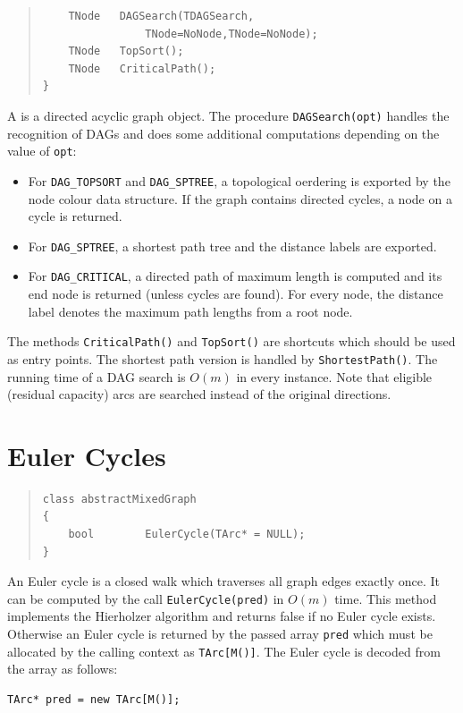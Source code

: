 \documentclass[a4paper,11pt,twoside]{book}
\begin{document}
\begin{multicols}{2}
\begin{quote}
\begin{verbatim}
    TNode   DAGSearch(TDAGSearch,
                TNode=NoNode,TNode=NoNode);
    TNode   TopSort();
    TNode   CriticalPath();
}
\end{verbatim}
\end{quote}
A  is a directed acyclic graph object. The procedure
\verb/DAGSearch(opt)/ handles the recognition of DAGs and does some additional
computations depending on the value of \verb/opt/:
\begin{itemize}
\item For \verb/DAG_TOPSORT/ and \verb/DAG_SPTREE/, a topological oerdering is
    exported by the node colour data structure. If the graph contains directed
    cycles, a node on a cycle is returned.
\item For \verb/DAG_SPTREE/, a shortest path tree and the distance labels are
    exported.
\item For \verb/DAG_CRITICAL/, a directed path of maximum length is computed
    and its end node is returned (unless cycles are found). For every node,
    the distance label denotes the maximum path lengths from a root node.
\end{itemize}
The methods \verb/CriticalPath()/ and \verb/TopSort()/ are shortcuts which
should be used as entry points. The shortest path version is handled by
\verb/ShortestPath()/. The running time of a DAG search is $O(m)$ in every
instance. Note that eligible (residual capacity) arcs are searched instead of
the original directions.



\label{slb_euler}
\section{Euler Cycles}
\methods
\begin{quote}
\begin{verbatim}
class abstractMixedGraph
{
    bool        EulerCycle(TArc* = NULL);
}
\end{verbatim}
\end{quote}
An Euler cycle is a closed walk which traverses all graph edges exactly once.
It can be computed by the call \verb/EulerCycle(pred)/ in $O(m)$ time. This method
implements the Hierholzer algorithm and returns false if no Euler cycle
exists. Otherwise an Euler cycle is returned by the passed array \verb/pred/
which must be allocated by the calling context as \verb/TArc[M()]/.
The Euler cycle is decoded from the array as follows:
\begin{mysample}
\begin{verbatim}
TArc* pred = new TArc[M()];


\end{verbatim}
\end{mysample}
\end{multicols}
\end{document}
